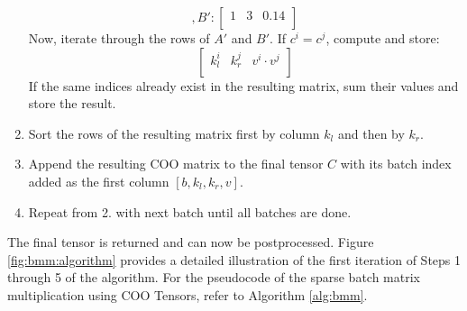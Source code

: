 \begin{enumerate}[label*=\arabic*.]
\begin{equation*}
              , B':
              \begin{bmatrix}
                  1 & 3 & 0.14 \\
              \end{bmatrix}
          \end{equation*}
          Now, iterate through the rows of $A'$ and $B'$. If $c^i = c^j$, compute and store:
          \begin{equation*}
              \begin{bmatrix}
                  k_l^i & k_r^j & v^i \cdot v^j \\
              \end{bmatrix}
          \end{equation*}
          If the same indices already exist in the resulting matrix, sum their values and store the result.
    \item Sort the rows of the resulting matrix first by column $k_l$ and then by $k_r$.
    \item Append the resulting COO matrix to the final tensor $C$ with its batch index added as the
          first column $[b, k_l, k_r, v]$.
    \item Repeat from 2. with next batch until all batches are done.
\end{enumerate}
The final tensor is returned and can now be postprocessed. Figure \ref{fig:bmm:algorithm} provides
a detailed illustration of the first iteration of Steps 1 through 5 of the algorithm. For the pseudocode of the sparse batch
matrix multiplication using COO Tensors, refer to Algorithm \ref{alg:bmm}.

